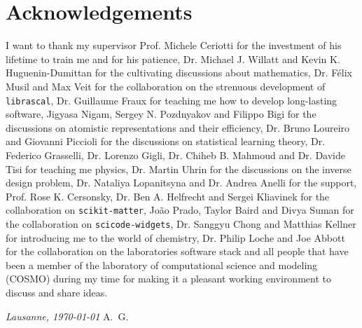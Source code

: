 \chapter*{Acknowledgements}
I want to thank my supervisor Prof. Michele Ceriotti for the investment of his lifetime to train me and for his patience, 
Dr. Michael J. Willatt and Kevin K. Huguenin-Dumittan for the cultivating discussions about mathematics, Dr. Félix Musil and Max Veit for the collaboration on the strenuous development of \texttt{librascal}, Dr. Guillaume Fraux for teaching me how to develop long-lasting software, Jigyasa Nigam, Sergey N. Pozdnyakov and Filippo Bigi for the discussions on atomistic representations and their efficiency, Dr. Bruno Loureiro and Giovanni Piccioli for the discussions on statistical learning theory, Dr. Federico Grasselli, Dr. Lorenzo Gigli, Dr. Chiheb B. Mahmoud and Dr. Davide Tisi for teaching me physics, Dr. Martin Uhrin for the discussions on the inverse design problem, Dr. Nataliya Lopanitsyna and Dr. Andrea Anelli for the support, Prof. Rose K. Cersonsky, Dr. Ben A. Helfrecht and Sergei Kliavinek for the collaboration on \texttt{scikit-matter}, João Prado, Taylor Baird and Divya Suman for the collaboration on \texttt{scicode-widgets}, Dr. Sanggyu Chong and Matthias Kellner for introducing me to the world of chemistry, Dr. Philip Loche and Joe Abbott for the collaboration on the laboratories software stack and all people that have been a member of the laboratory of computational science and modeling (COSMO) during my time for making it a pleasant working environment to discuss and share ideas.

%
%
%
%

\bigskip
 
\noindent\textit{Lausanne, \today}
\hfill A.~G.
